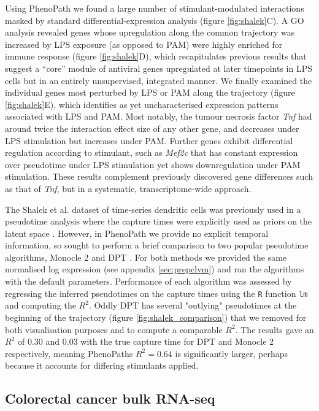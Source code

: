 Using PhenoPath we found a large number of stimulant-modulated interactions masked by standard differential-expression analysis (figure \ref{fig:shalek}C). A GO analysis revealed genes whose upregulation along the common trajectory was increased by LPS exposure (as opposed to PAM) were highly enriched for immune response (figure \ref{fig:shalek}D), which recapitulates previous results\cite{Shalek2014-cg,Reid2016-yo} that suggest a ``core'' module of antiviral genes upregulated at later timepoints in LPS cells but in an entirely unsupervised, integrated manner. We finally examined the individual genes most perturbed by LPS or PAM along the trajectory (figure \ref{fig:shalek}E), which identifies as yet uncharacterised expression patterns associated with LPS and PAM. 
Most notably, the tumour necrosis factor \emph{Tnf} had around twice the interaction effect size of any other gene, and decreases under LPS stimulation but increases under PAM.
Further genes exhibit differential regulation according to stimulant, such as \emph{Mef2c} that has constant expression over pseudotime under LPS stimulation yet shows downregulation under PAM stimulation.
These results complement previously discovered gene differences such as that of \emph{Tnf}, but in a systematic, transcriptome-wide approach.

The Shalek et al. dataset of time-series dendritic cells was previously used in a pseudotime analysis where the capture times were explicitly used as priors on the latent space \cite{Reid2016-yo}. However, in PhenoPath we provide no explicit temporal information, so sought to perform a brief comparison to two popular pseudotime algorithms, Monocle 2 \cite{Qiu2017-eu} and DPT \cite{haghverdi2016diffusion}. For both methods we provided the same normalised log expression (see appendix \ref{sec:prepclvm}) and ran the algorithms with the default parameters. Performance of each algorithm was assessed by regressing the inferred pseudotimes on the capture times using the \texttt{R} function \texttt{lm} and computing the $R^2$. Oddly DPT has several "outlying" pseudotimes at the beginning of the trajectory (figure \ref{fig:shalek_comparison}) that we removed for both visualisation purposes and to compute a comparable $R^2$. The results gave an $R^2$ of $0.30$ and $0.03$ with the true capture time for DPT and Monocle 2 respectively, meaning PhenoPaths $R^2 = 0.64$ is significantly larger, perhaps because it accounts for differing stimulants applied. 


\subsection{Colorectal cancer bulk RNA-seq} \label{sec:coad}

